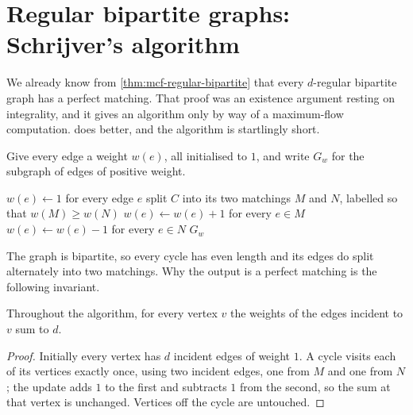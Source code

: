 \section{Regular bipartite graphs: Schrijver's algorithm}
\label{sec:matching-schrijver}

We already know from \cref{thm:mcf-regular-bipartite} that every $d$-regular
bipartite graph has a perfect matching. That proof was an existence argument
resting on integrality, and it gives an algorithm only by way of a maximum-flow
computation. \citet{Schrijver1999} does better, and the algorithm is startlingly
short.

Give every edge a weight $w(e)$, all initialised to $1$, and write $G_w$ for the
subgraph of edges of positive weight.

\begin{algorithm}[ht]
\caption{Schrijver's algorithm}
\label{alg:matching-schrijver}
\begin{algorithmic}[1]
  \State $w(e) \gets 1$ for every edge $e$
     \State split $C$ into its two matchings $M$ and $N$, labelled so that
            $w(M) \ge w(N)$
     \State $w(e) \gets w(e) + 1$ for every $e \in M$
     \State $w(e) \gets w(e) - 1$ for every $e \in N$
  \EndWhile
  \State \Return $G_w$
\end{algorithmic}
\end{algorithm}

The graph is bipartite, so every cycle has even length and its edges do split
alternately into two matchings. Why the output is a perfect matching is the
following invariant.

\begin{lemma}\label{lem:matching-schrijver-invariant}
Throughout the algorithm, for every vertex $v$ the weights of the edges incident
to $v$ sum to $d$.
\end{lemma}

\begin{proof}
Initially every vertex has $d$ incident edges of weight $1$. A cycle visits each
of its vertices exactly once, using two incident edges, one from $M$ and one
from $N$; the update adds $1$ to the first and subtracts $1$ from the second, so
the sum at that vertex is unchanged. Vertices off the cycle are untouched.
\end{proof}

